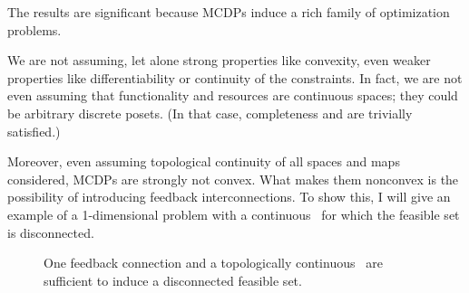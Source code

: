 The results are significant because MCDPs induce a rich family of
optimization problems.

We are not assuming, let alone strong properties like convexity, even
weaker properties like differentiability or continuity of the constraints.
In fact, we are not even assuming that functionality and resources
are continuous spaces; they could be arbitrary discrete posets. (In
that case, completeness and \scottcontinuity are trivially satisfied.)

Moreover, even assuming topological continuity of all spaces and maps
considered, MCDPs are strongly not convex. What makes them nonconvex
is the possibility of introducing feedback interconnections. To show
this, I will give an example of a 1-dimensional problem with a continuous~\ftor
for which the feasible set is disconnected.

\begin{figure}[h]
  \hfill
  \hfill
  \hfill
  \caption{One feedback connection and a topologically continuous~\ftor
  are sufficient to induce a disconnected feasible set.}
  \label{fig:ceil-1}
\end{figure}

\medskip{}

